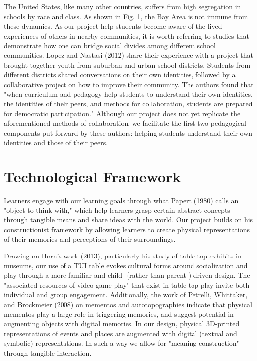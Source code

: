 \documentclass{sigchi-ext}
\begin{document}
The United States, like many other countries, suffers from high segregation in schools by race and class. As shown in Fig. 1, the Bay Area is not immune from these dynamics. As our project help students become aware of the lived experiences of others in nearby communities, it is worth referring to studies that demonstrate how one can bridge social divides among different school communities. Lopez and Nastasi (2012) share their experience with a project that brought together youth from suburban and urban school districts. Students from different districts shared conversations on their own identities, followed by a collaborative project on how to improve their community. The authors found that "when curriculum and pedagogy help students to understand their own identities, the identities of their peers, and methods for collaboration, students are prepared for democratic participation." Although our project does not yet replicate the aforementioned methods of collaboration, we facilitate the first two pedagogical components put forward by these authors: helping students understand their own identities and those of their peers. 

\section{Technological Framework}
Learners engage with our learning goals through what Papert (1980) calls an "object-to-think-with," which help learners grasp certain abstract concepts through tangible means and share ideas with the world. Our project builds on his constructionist framework by allowing learners to create physical representations of their memories and perceptions of their surroundings. 

Drawing on Horn's work (2013), particularly his study of table top exhibits in museums, our use of a TUI table evokes cultural forms around socialization and play through a more familiar and child- (rather than parent-) driven design. The "associated resources of video game play" that exist in table top play invite both individual and group engagement. Additionally, the work of Petrelli, Whittaker, and Brockmeier (2008) on mementos and autotopographies indicate that physical mementos play a large role in triggering memories, and suggest potential in augmenting objects with digital memories. In our design, physical 3D-printed representations of events and places are augmented with digital (textual and symbolic) representations. In such a way we allow for "meaning construction" through tangible interaction.
\end{document}
